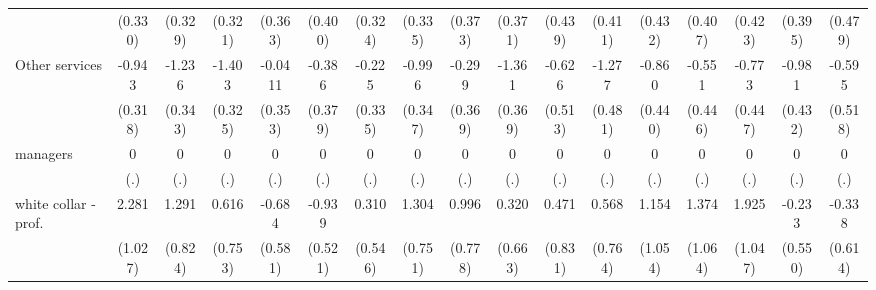 {\begin{tabular}{l*{16}{c}}
                    &     (0.330)         &     (0.329)         &     (0.321)         &     (0.363)         &     (0.400)         &     (0.324)         &     (0.335)         &     (0.373)         &     (0.371)         &     (0.439)         &     (0.411)         &     (0.432)         &     (0.407)         &     (0.423)         &     (0.395)         &     (0.479)         \\
[1em]
Other services      &      -0.943\sym{**} &      -1.236\sym{***}&      -1.403\sym{***}&     -0.0411         &      -0.386         &      -0.225         &      -0.996\sym{**} &      -0.299         &      -1.361\sym{***}&      -0.626         &      -1.277\sym{**} &      -0.860         &      -0.551         &      -0.773         &      -0.981\sym{*}  &      -0.595         \\
                    &     (0.318)         &     (0.343)         &     (0.325)         &     (0.353)         &     (0.379)         &     (0.335)         &     (0.347)         &     (0.369)         &     (0.369)         &     (0.513)         &     (0.481)         &     (0.440)         &     (0.446)         &     (0.447)         &     (0.432)         &     (0.518)         \\
[1em]
managers            &           0         &           0         &           0         &           0         &           0         &           0         &           0         &           0         &           0         &           0         &           0         &           0         &           0         &           0         &           0         &           0         \\
                    &         (.)         &         (.)         &         (.)         &         (.)         &         (.)         &         (.)         &         (.)         &         (.)         &         (.)         &         (.)         &         (.)         &         (.)         &         (.)         &         (.)         &         (.)         &         (.)         \\
[1em]
white collar - prof.&       2.281\sym{*}  &       1.291         &       0.616         &      -0.684         &      -0.939         &       0.310         &       1.304         &       0.996         &       0.320         &       0.471         &       0.568         &       1.154         &       1.374         &       1.925         &      -0.233         &      -0.338         \\
                    &     (1.027)         &     (0.824)         &     (0.753)         &     (0.581)         &     (0.521)         &     (0.546)         &     (0.751)         &     (0.778)         &     (0.663)         &     (0.831)         &     (0.764)         &     (1.054)         &     (1.064)         &     (1.047)         &     (0.550)         &     (0.614)         \\

\end{tabular}}
